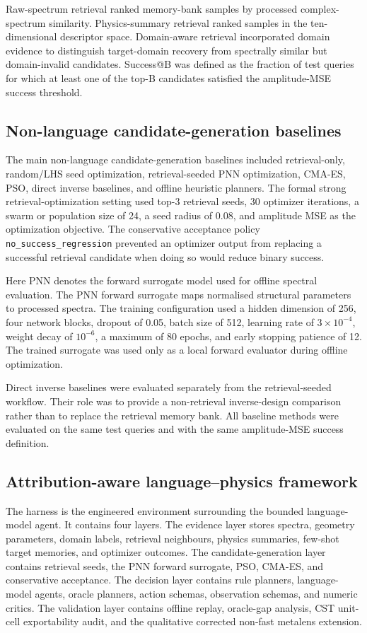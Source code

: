 \documentclass[final,1p,times]{elsarticle}
\newcommand{\code}[1]{\texttt{#1}}
\begin{document}
Raw-spectrum retrieval ranked memory-bank samples by processed complex-spectrum similarity. Physics-summary retrieval ranked samples in the ten-dimensional descriptor space. Domain-aware retrieval incorporated domain evidence to distinguish target-domain recovery from spectrally similar but domain-invalid candidates. Success@B was defined as the fraction of test queries for which at least one of the top-B candidates satisfied the amplitude-MSE success threshold.

\subsection{Non-language candidate-generation baselines}

The main non-language candidate-generation baselines included retrieval-only, random/LHS seed optimization, retrieval-seeded PNN optimization, CMA-ES, PSO, direct inverse baselines, and offline heuristic planners. The formal strong retrieval-optimization setting used top-3 retrieval seeds, 30 optimizer iterations, a swarm or population size of 24, a seed radius of 0.08, and amplitude MSE as the optimization objective. The conservative acceptance policy \code{no\_success\_regression} prevented an optimizer output from replacing a successful retrieval candidate when doing so would reduce binary success.

Here PNN denotes the forward surrogate model used for offline spectral evaluation. The PNN forward surrogate maps normalised structural parameters to processed spectra. The training configuration used a hidden dimension of 256, four network blocks, dropout of 0.05, batch size of 512, learning rate of $3\times10^{-4}$, weight decay of $10^{-6}$, a maximum of 80 epochs, and early stopping patience of 12. The trained surrogate was used only as a local forward evaluator during offline optimization.

Direct inverse baselines were evaluated separately from the retrieval-seeded workflow. Their role was to provide a non-retrieval inverse-design comparison rather than to replace the retrieval memory bank. All baseline methods were evaluated on the same test queries and with the same amplitude-MSE success definition.

\subsection{Attribution-aware language--physics framework}

The harness is the engineered environment surrounding the bounded language-model agent. It contains four layers. The evidence layer stores spectra, geometry parameters, domain labels, retrieval neighbours, physics summaries, few-shot target memories, and optimizer outcomes. The candidate-generation layer contains retrieval seeds, the PNN forward surrogate, PSO, CMA-ES, and conservative acceptance. The decision layer contains rule planners, language-model agents, oracle planners, action schemas, observation schemas, and numeric critics. The validation layer contains offline replay, oracle-gap analysis, CST unit-cell exportability audit, and the qualitative corrected non-fast metalens extension.
\end{document}
